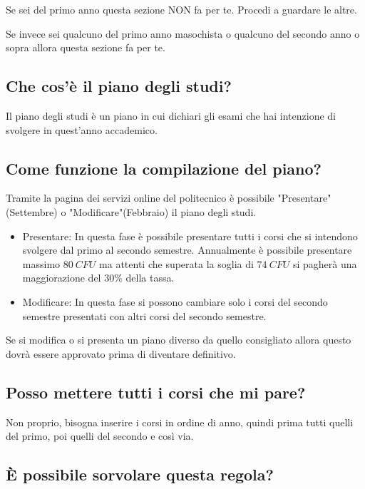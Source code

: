 \documentclass[legal]{polinetwork}
\begin{document}
Se sei del primo anno questa sezione NON fa per te. Procedi a guardare le altre.

Se invece sei qualcuno del primo anno masochista o qualcuno del secondo anno o sopra allora questa sezione fa per te.

\subsection{Che cos'è il piano degli studi?}


Il piano degli studi è un piano in cui dichiari gli esami che hai intenzione di svolgere in quest'anno accademico.

\subsection{Come funzione la compilazione del piano?}


Tramite la pagina dei servizi online del politecnico è possibile "Presentare" (Settembre) o "Modificare"(Febbraio) il piano degli studi.

\begin{itemize}
  \item Presentare: In questa fase è possibile presentare tutti i corsi che si intendono svolgere dal primo al secondo semestre. Annualmente è possibile presentare massimo $80\ CFU$ ma attenti che superata la soglia di $74\ CFU$ si pagherà una maggiorazione del $30\%$ della tassa.
  \item Modificare: In questa fase si possono cambiare solo i corsi del secondo semestre presentati con altri corsi del secondo semestre.
\end{itemize}


Se si modifica o si presenta un piano diverso da quello consigliato allora questo dovrà essere approvato prima di diventare definitivo.

\subsection{Posso mettere tutti i corsi che mi pare?}


Non proprio, bisogna inserire i corsi in ordine di anno, quindi prima tutti quelli del primo, poi quelli del secondo e così via.

\subsection{È possibile sorvolare questa regola?}
\end{document}
